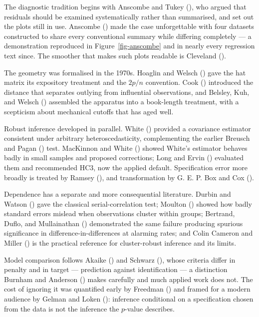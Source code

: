 \documentclass[
  letterpaper,
  10pt,
  twoside,
  openright,
  numbers=noenddot,
  chapterprefix=true]{scrbook}
\begin{document}
\begin{qmiblit}

The diagnostic tradition begins with Anscombe and Tukey
(), who argued that residuals should be
examined systematically rather than summarised, and set out the plots
still in use. Anscombe () made the case
unforgettable with four datasets constructed to share every conventional
summary while differing completely --- a demonstration reproduced in
Figure~\ref{fig-anscombe} and in nearly every regression text since. The
smoother that makes such plots readable is Cleveland
().

The geometry was formalised in the 1970s. Hoaglin and Welsch
() gave the hat matrix its expository
treatment and the \(2p/n\) convention. Cook
() introduced the distance that separates
outlying from influential observations, and Belsley, Kuh, and Welsch
() assembled the apparatus into a
book-length treatment, with a scepticism about mechanical cutoffs that
has aged well.

Robust inference developed in parallel. White
() provided a covariance estimator
consistent under arbitrary heteroscedasticity, complementing the earlier
Breusch and Pagan () test. MacKinnon and
White () showed White's estimator
behaves badly in small samples and proposed corrections; Long and Ervin
() evaluated them and recommended HC3, now
the applied default. Specification error more broadly is treated by
Ramsey (), and transformation by G. E. P.
Box and Cox ().

Dependence has a separate and more consequential literature. Durbin and
Watson () gave the classical
serial-correlation test; Moulton ()
showed how badly standard errors mislead when observations cluster
within groups; Bertrand, Duflo, and Mullainathan
() demonstrated the same failure
producing spurious significance in difference-in-differences at alarming
rates; and Colin Cameron and Miller ()
is the practical reference for cluster-robust inference and its limits.

Model comparison follows Akaike () and
Schwarz (), whose criteria differ in
penalty and in target --- prediction against identification --- a
distinction Burnham and Anderson ()
makes carefully and much applied work does not. The cost of ignoring it
was quantified early by Freedman () and
framed for a modern audience by Gelman and Loken
(): inference conditional on a
specification chosen from the data is not the inference the \(p\)-value
describes.


\end{qmiblit}
\end{document}
